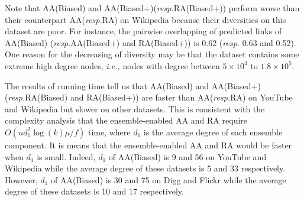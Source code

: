 \documentclass[10pt,journal,compsoc]{IEEEtran}
\newcommand{\Aa}{{\sf AA}\xspace }
\newcommand{\RA}{{\sf RA}\xspace }
\newcommand{\Digg}{{\sf Digg}\xspace}
\newcommand{\YouTube}{{\sf YouTube}\xspace}
\newcommand{\Flickr}{{\sf Flickr}\xspace}
\newcommand{\Wikipedia}{{\sf Wikipedia}\xspace}
\newcommand{\AABiased}{{\sf AA(Biased)}\xspace}
\newcommand{\AABiasedp}{{\sf AA(Biased+)}\xspace}
\newcommand{\RABiased}{{\sf RA(Biased)}\xspace}
\newcommand{\RABiasedp}{{\sf RA(Biased+)}\xspace}
\newcommand{\ie}{\emph{i.e.,}\xspace}
\newcommand{\resp}{\emph{resp.}\xspace}
\begin{document}
Note that \AABiased and \AABiasedp (\resp \RABiasedp)
perform worse than their counterpart \Aa (\resp \RA) on \Wikipedia because their diversities
on this dataset are poor. For instance, the pairwise overlapping of predicted links of \AABiased
(\resp \AABiasedp and \RABiasedp) is 0.62 (\resp 0.63 and 0.52). One reason for the decreasing
of diversity may be that the dataset contains some extreme high degree nodes,
\ie nodes with degree between $5 \times 10^4$ to $1.8 \times 10^5$.

The results of running time tell us that \AABiased and \AABiasedp (\resp \RABiased and \RABiasedp)
are faster than \Aa (\resp \RA) on \YouTube and \Wikipedia but
slower on other datasets. This is consistent with the complexity analysis
that the ensemble-enabled \Aa and \RA require $O(nd_{1}^{2}\log(k)\mu/f)$ time,
where $d_1$ is the average degree of each ensemble component. It is means
that the ensemble-enabled \Aa and \RA would be faster when $d_1$ is small.
Indeed, $d_1$ of \AABiased is 9 and 56 on \YouTube and \Wikipedia while the average
degree of these datasets is 5 and 33 respectively. However, $d_1$ of \AABiased is 30 and 75
on \Digg and \Flickr while the average degree of these datasets is 10 and 17 respectively.





\begin{footnotesize}


\end{footnotesize}
\end{document}
